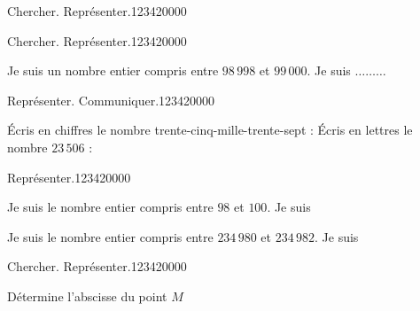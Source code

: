 \begin{pageAD}
\begin{ExoCad}{Chercher. Représenter.}{1234}{2}{0}{0}{0}{0}
\end{ExoCad}
    
\begin{ExoCad}{Chercher. Représenter.}{1234}{2}{0}{0}{0}{0}

Je suis un nombre entier compris entre  $98\,998$ et $99\,000$. Je suis $\ldots \ldots\ldots$

\end{ExoCad}
    
 

\end{pageAD} 


\begin{pageParcoursu}

\begin{ExoCu}{Représenter. Communiquer.}{1234}{2}{0}{0}{0}{0}

Écris en chiffres le nombre trente-cinq-mille-trente-sept : 
\vspace{0.2cm}
Écris en lettres le nombre $23\,506$ : 
  
\end{ExoCu}


\begin{ExoCu}{Représenter.}{1234}{2}{0}{0}{0}{0}

Je suis le nombre entier compris entre  $98$ et $100$. Je suis  \vspace{0.2cm}
 
Je suis le nombre entier compris entre  $234\,980$ et $234\,982$. Je suis 
\end{ExoCu}

\begin{ExoCu}{Chercher. Représenter.}{1234}{2}{0}{0}{0}{0}

Détermine l'abscisse du point $M$ 


\end{ExoCu}
\end{pageParcoursu}
